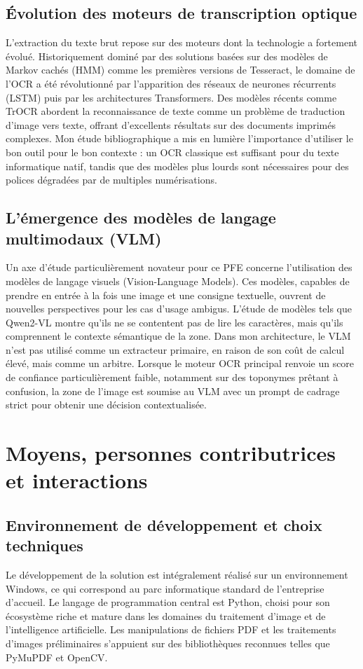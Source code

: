 \documentclass[a4paper,11pt]{article}
\begin{document}
\subsection{Évolution des moteurs de transcription optique}
L'extraction du texte brut repose sur des moteurs dont la technologie a fortement évolué. Historiquement dominé par des solutions basées sur des modèles de Markov cachés (HMM) comme les premières versions de Tesseract, le domaine de l'OCR a été révolutionné par l'apparition des réseaux de neurones récurrents (LSTM) puis par les architectures Transformers. Des modèles récents comme TrOCR abordent la reconnaissance de texte comme un problème de traduction d'image vers texte, offrant d'excellents résultats sur des documents imprimés complexes. Mon étude bibliographique a mis en lumière l'importance d'utiliser le bon outil pour le bon contexte : un OCR classique est suffisant pour du texte informatique natif, tandis que des modèles plus lourds sont nécessaires pour des polices dégradées par de multiples numérisations.

\subsection{L'émergence des modèles de langage multimodaux (VLM)}
Un axe d'étude particulièrement novateur pour ce PFE concerne l'utilisation des modèles de langage visuels (Vision-Language Models). Ces modèles, capables de prendre en entrée à la fois une image et une consigne textuelle, ouvrent de nouvelles perspectives pour les cas d'usage ambigus. L'étude de modèles tels que Qwen2-VL montre qu'ils ne se contentent pas de lire les caractères, mais qu'ils comprennent le contexte sémantique de la zone. Dans mon architecture, le VLM n'est pas utilisé comme un extracteur primaire, en raison de son coût de calcul élevé, mais comme un arbitre. Lorsque le moteur OCR principal renvoie un score de confiance particulièrement faible, notamment sur des toponymes prêtant à confusion, la zone de l'image est soumise au VLM avec un prompt de cadrage strict pour obtenir une décision contextualisée.

\section{Moyens, personnes contributrices et interactions}

\subsection{Environnement de développement et choix techniques}
Le développement de la solution est intégralement réalisé sur un environnement Windows, ce qui correspond au parc informatique standard de l'entreprise d'accueil. Le langage de programmation central est Python, choisi pour son écosystème riche et mature dans les domaines du traitement d'image et de l'intelligence artificielle. Les manipulations de fichiers PDF et les traitements d'images préliminaires s'appuient sur des bibliothèques reconnues telles que PyMuPDF et OpenCV. 
\end{document}
